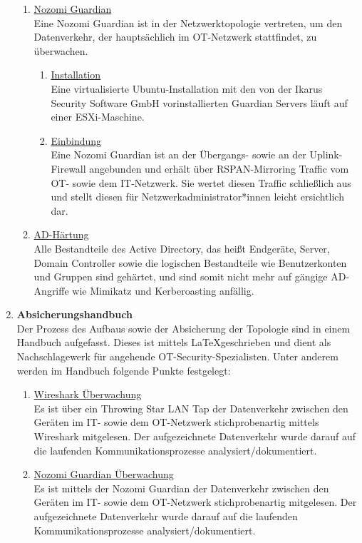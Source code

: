 \documentclass[
	headings=optiontotocandhead,%
	oneside,
	numbers=noenddot,%
	toc=flat, %
	10pt, %
	parskip=full, %
	listof=totoc, %
	listof=flat, %
	numbers=noenddot, %
	bibliography=totoc, %
	a4paper,DIV=14,
]{scrartcl}
\begin{document}
\begin{enumerate}[start=1,label={\bfseries Ziel-H \arabic*},leftmargin=*,wide]
\begin{enumerate}[label=\alph*.]
\item{\underline{Nozomi Guardian}}\\
Eine Nozomi Guardian ist in der Netzwerktopologie vertreten, um den Datenverkehr, der hauptsächlich im OT-Netzwerk stattfindet, zu überwachen.
\begin{enumerate}[label=\roman*.]
\item{\underline{Installation}}\\
Eine virtualisierte Ubuntu-Installation mit den von der Ikarus Security Software GmbH vorinstallierten Guardian Servers läuft auf einer ESXi-Maschine.

\item{\underline{Einbindung}}\\
Eine Nozomi Guardian ist an der Übergangs- sowie an der Uplink-Firewall angebunden und erhält über RSPAN-Mirroring Traffic vom OT- sowie dem IT-Netzwerk. Sie wertet diesen Traffic schließlich aus und stellt diesen für Netzwerkadministrator*innen leicht ersichtlich dar.
\end{enumerate}

\item{\underline{AD-Härtung}}\\
Alle Bestandteile des Active Directory, das heißt Endgeräte, Server, Domain Controller sowie die logischen Bestandteile wie Benutzerkonten und Gruppen sind gehärtet, und sind somit nicht mehr auf gängige AD-Angriffe wie Mimikatz und Kerberoasting anfällig.
\end{enumerate}

\item{\bfseries{Absicherungshandbuch}}\\
Der Prozess des Aufbaus sowie der Absicherung der Topologie sind in einem Handbuch aufgefasst. Dieses ist mittels \LaTeX geschrieben und dient als Nachschlagewerk für angehende OT-Security-Spezialisten. Unter anderem werden im Handbuch folgende Punkte festgelegt:
\begin{enumerate}[label=\alph*.]
\item{\underline{Wireshark Überwachung}}\\
Es ist über ein Throwing Star LAN Tap der Datenverkehr zwischen den Geräten im IT- sowie dem OT-Netzwerk stichprobenartig mittels Wireshark mitgelesen. Der aufgezeichnete Datenverkehr wurde darauf auf die laufenden Kommunikationsprozesse analysiert/dokumentiert.

\item{\underline{Nozomi Guardian Überwachung}}\\
Es ist mittels der Nozomi Guardian der Datenverkehr zwischen den Geräten im IT- sowie dem OT-Netzwerk stichprobenartig mitgelesen. Der aufgezeichnete Datenverkehr wurde darauf auf die laufenden Kommunikationsprozesse analysiert/dokumentiert.


\end{enumerate}
\end{enumerate}
\end{document}
